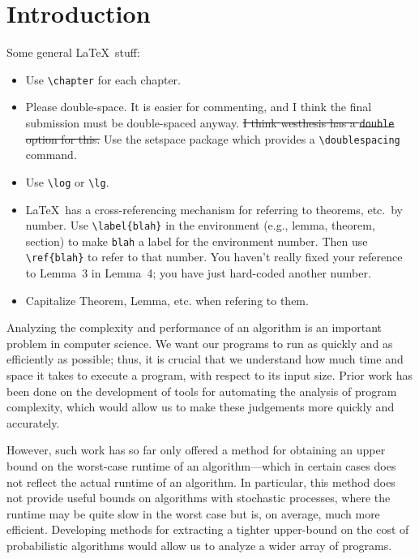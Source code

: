 \section{Introduction}
\begin{ndBlockComment}
Some general \LaTeX\ stuff:
\begin{itemize}
\item Use \verb!\chapter! for each chapter.

\item
Please double-space.  It is easier for commenting, and I think
the final submission must be double-spaced anyway.  
\cprotect\sout{I think
\textsf{westhesis} has a \verb!double! option for this.}
Use the \textsf{setspace} package which provides a \verb!\doublespacing!
command.

\item Use \verb!\log! or \verb!\lg!.

\item
\LaTeX\ has a cross-referencing
mechanism for referring to theorems, etc.\ by number.  
Use \verb!\label{blah}! in the environment
(e.g., lemma, theorem, section) to make \verb!blah! a label for the
environment number.  Then use \verb!\ref{blah}! to refer to that number.
You haven't really fixed your reference to Lemma~3 in Lemma~4; you have
just hard-coded another number.

\item Capitalize Theorem, Lemma, etc. when refering to them.

\end{itemize}
\end{ndBlockComment}

Analyzing the complexity and performance of an algorithm is an important problem in computer science. We want our programs to run as quickly and as efficiently as possible; thus, it is crucial that we understand how much time and space it takes to execute a program, with respect to its input size. Prior work has been done on the development of tools
for automating the analysis of program complexity, which would allow us to make these judgements more quickly and accurately. 

However, such work has so far only offered a method for obtaining an upper bound on the worst-case runtime of an algorithm---which in certain cases does not reflect the actual runtime of an algorithm. In particular, this method does not
provide useful bounds on algorithms with stochastic processes, where the runtime may be quite slow in the worst case but
is, on average, much more efficient. Developing methods for extracting a tighter upper-bound on the cost of probabilistic algorithms would allow us to analyze a wider array of programs.

